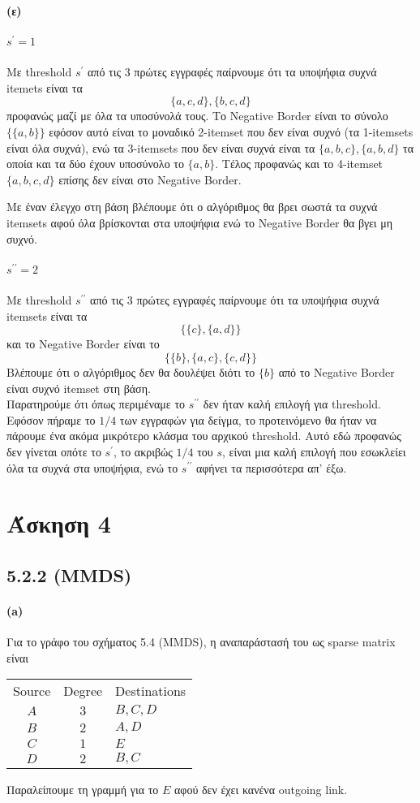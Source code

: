 \documentclass[a4paper,11pt]{article}
\begin{document}
\paragraph{(ε)}
\subparagraph{$s^\prime=1$} Με threshold $s^\prime$ από τις 3 πρώτες εγγραφές παίρνουμε ότι τα υποψήφια συχνά itemets είναι τα
\[ \{a,c,d\},\{b,c,d\} \]
προφανώς μαζί με όλα τα υποσύνολά τους.
Το Negative Border είναι το σύνολο $\{ \{a,b\} \}$ εφόσον αυτό είναι το μοναδικό 2-itemset που δεν είναι συχνό (τα 1-itemsets είναι όλα συχνά), ενώ τα 3-itemsets που δεν είναι συχνά είναι τα $\{a,b,c\},\{a,b,d\}$ τα οποία και τα δύο έχουν υποσύνολο το $\{a,b\}$.
Τέλος προφανώς και το 4-itemset $\{a,b,c,d\}$ επίσης δεν είναι στο Negative Border.

Με έναν έλεγχο στη βάση βλέπουμε ότι ο αλγόριθμος θα βρει σωστά τα συχνά itemsets αφού όλα βρίσκονται στα υποψήφια ενώ το Negative Border θα βγει μη συχνό.

\subparagraph{$s^{\prime\prime}=2$} Με threshold $s^{\prime\prime}$ από τις 3 πρώτες εγγραφές παίρνουμε ότι τα υποψήφια συχνά itemsets είναι τα
\[ \{ \{c\},\{a,d\} \} \]
και το Negative Border είναι το
\[ \{ \{b\},\{a,c\},\{c,d\} \} \]
Βλέπουμε ότι ο αλγόριθμος δεν θα δουλέψει διότι το $\{b\}$ από το Negative Border είναι συχνό itemset στη βάση.
\\[8pt]
Παρατηρούμε ότι όπως περιμέναμε το $s^{\prime\prime}$ δεν ήταν καλή επιλογή για threshold.
Εφόσον πήραμε το $1/4$ των εγγραφών για δείγμα, το προτεινόμενο θα ήταν να πάρουμε ένα ακόμα μικρότερο κλάσμα του αρχικού threshold.
Αυτό εδώ προφανώς δεν γίνεται οπότε το $s^\prime$, το ακριβώς $1/4$ του $s$, είναι μια καλή επιλογή που εσωκλείει όλα τα συχνά στα υποψήφια, ενώ το $s^{\prime\prime}$ αφήνει τα περισσότερα απ' έξω.

\section*{Άσκηση 4}

\subsection*{5.2.2 (MMDS)}

\paragraph{(a)} Για το γράφο του σχήματος 5.4 (MMDS), η αναπαράστασή του ως sparse matrix είναι
\begin{center}
	\begin{tabular}{| c | c | l |}
		\hline
		Source & Degree & Destinations \\ \hhline{|=|=|=|}
		$A$ & $3$ & $B,C,D$ \\
		$B$ & $2$ & $A,D$ \\
		$C$ & $1$ & $E$ \\
		$D$ & $2$ & $B,C$ \\
		\hline
	\end{tabular}
\end{center}
Παραλείπουμε τη γραμμή για το $E$ αφού δεν έχει κανένα outgoing link.
\end{document}
